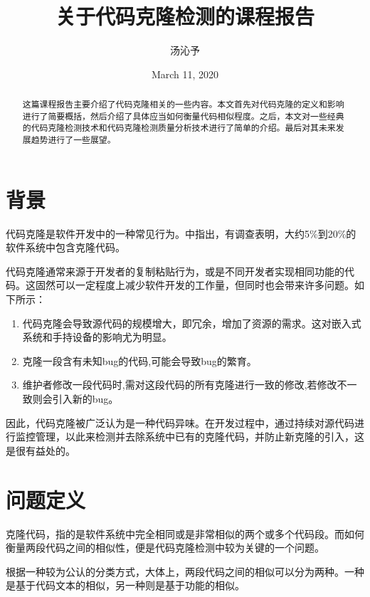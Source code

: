\documentclass[UTF8]{ctexart}
\begin{document}
	
	\title{关于代码克隆检测的课程报告}
	\author{汤沁予}
	\date{March 11, 2020}
	\maketitle
	
\begin{abstract}
	这篇课程报告主要介绍了代码克隆相关的一些内容。本文首先对代码克隆的定义和影响进行了简要概括，然后介绍了具体应当如何衡量代码相似程度。之后，本文对一些经典的代码克隆检测技术和代码克隆检测质量分析技术进行了简单的介绍。最后对其未来发展趋势进行了一些展望。
\end{abstract}

\section{背景}
代码克隆是软件开发中的一种常见行为。\cite{Min2019}中指出，有调查表明，大约5\%到20\%的软件系统中包含克隆代码。

代码克隆通常来源于开发者的复制粘贴行为，或是不同开发者实现相同功能的代码。这固然可以一定程度上减少软件开发的工作量，但同时也会带来许多问题。如下所示：

\begin{enumerate}
	\item 代码克隆会导致源代码的规模增大，即冗余，增加了资源的需求。这对嵌入式系统和手持设备的影响尤为明显。
	\item 克隆一段含有未知bug的代码,可能会导致bug的繁育。
	\item 维护者修改一段代码时,需对这段代码的所有克隆进行一致的修改,若修改不一致则会引入新的bug。
\end{enumerate}

因此，代码克隆被广泛认为是一种代码异味。在开发过程中，通过持续对源代码进行监控管理，以此来检测并去除系统中已有的克隆代码，并防止新克隆的引入，这是很有益处的。


\section{问题定义}
克隆代码，指的是软件系统中完全相同或是非常相似的两个或多个代码段。而如何衡量两段代码之间的相似性，便是代码克隆检测中较为关键的一个问题。

根据一种较为公认的分类方式，大体上，两段代码之间的相似可以分为两种。一种是基于代码文本的相似，另一种则是基于功能的相似。
\end{document}
